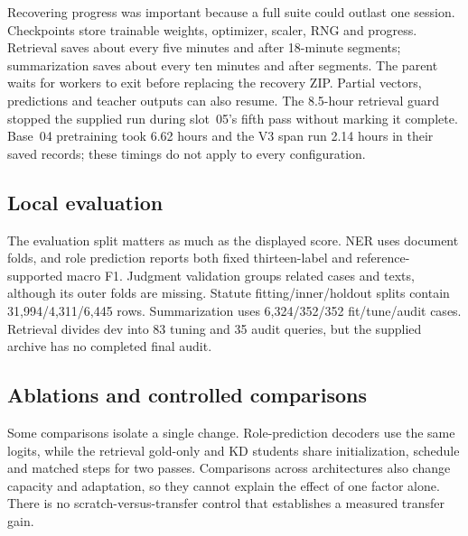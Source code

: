 Recovering progress was important because a full suite could outlast one session. Checkpoints store trainable weights, optimizer, scaler, RNG and progress. Retrieval saves about every five minutes and after 18-minute segments; summarization saves about every ten minutes and after segments. The parent waits for workers to exit before replacing the recovery ZIP. Partial vectors, predictions and teacher outputs can also resume. The 8.5-hour retrieval guard stopped the supplied run during slot~05's fifth pass without marking it complete. Base~04 pretraining took 6.62 hours and the V3 span run 2.14 hours in their saved records; these timings do not apply to every configuration.

\subsection{Local evaluation}
The evaluation split matters as much as the displayed score. NER uses document folds, and role prediction reports both fixed thirteen-label and reference-supported macro F1. Judgment validation groups related cases and texts, although its outer folds are missing. Statute fitting/inner/holdout splits contain 31,994/4,311/6,445 rows. Summarization uses 6,324/352/352 fit/tune/audit cases. Retrieval divides dev into 83 tuning and 35 audit queries, but the supplied archive has no completed final audit.

\subsection{Ablations and controlled comparisons}
Some comparisons isolate a single change. Role-prediction decoders use the same logits, while the retrieval gold-only and KD students share initialization, schedule and matched steps for two passes. Comparisons across architectures also change capacity and adaptation, so they cannot explain the effect of one factor alone. There is no scratch-versus-transfer control that establishes a measured transfer gain.
